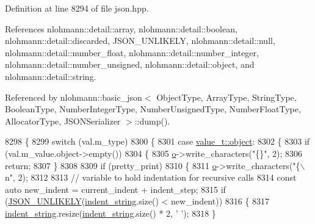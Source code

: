 Definition at line 8294 of file json.\+hpp.



References nlohmann\+::detail\+::array, nlohmann\+::detail\+::boolean, nlohmann\+::detail\+::discarded, J\+S\+O\+N\+\_\+\+U\+N\+L\+I\+K\+E\+LY, nlohmann\+::detail\+::null, nlohmann\+::detail\+::number\+\_\+float, nlohmann\+::detail\+::number\+\_\+integer, nlohmann\+::detail\+::number\+\_\+unsigned, nlohmann\+::detail\+::object, and nlohmann\+::detail\+::string.



Referenced by nlohmann\+::basic\+\_\+json$<$ Object\+Type, Array\+Type, String\+Type, Boolean\+Type, Number\+Integer\+Type, Number\+Unsigned\+Type, Number\+Float\+Type, Allocator\+Type, J\+S\+O\+N\+Serializer $>$\+::dump().


\begin{DoxyCode}
8298     \{
8299         \textcolor{keywordflow}{switch} (val.m\_type)
8300         \{
8301             \textcolor{keywordflow}{case} \hyperlink{namespacenlohmann_1_1detail_a1ed8fc6239da25abcaf681d30ace4985aa8cfde6331bd59eb2ac96f8911c4b666}{value\_t::object}:
8302             \{
8303                 \textcolor{keywordflow}{if} (val.m\_value.object->empty())
8304                 \{
8305                     \hyperlink{classnlohmann_1_1detail_1_1serializer_acf3c88660d3cbc65fc71c4d84f2a9f59}{o}->write\_characters(\textcolor{stringliteral}{"\{\}"}, 2);
8306                     \textcolor{keywordflow}{return};
8307                 \}
8308 
8309                 \textcolor{keywordflow}{if} (pretty\_print)
8310                 \{
8311                     \hyperlink{classnlohmann_1_1detail_1_1serializer_acf3c88660d3cbc65fc71c4d84f2a9f59}{o}->write\_characters(\textcolor{stringliteral}{"\{\(\backslash\)n"}, 2);
8312 
8313                     \textcolor{comment}{// variable to hold indentation for recursive calls}
8314                     \textcolor{keyword}{const} \textcolor{keyword}{auto} new\_indent = current\_indent + indent\_step;
8315                     \textcolor{keywordflow}{if} (\hyperlink{json_8hpp_ab77582407c64944e7db1ea95ab520253}{JSON\_UNLIKELY}(\hyperlink{classnlohmann_1_1detail_1_1serializer_ae9268a10d88a5526e32735a55a132fc6}{indent\_string}.size() < new\_indent))
8316                     \{
8317                         \hyperlink{classnlohmann_1_1detail_1_1serializer_ae9268a10d88a5526e32735a55a132fc6}{indent\_string}.resize(\hyperlink{classnlohmann_1_1detail_1_1serializer_ae9268a10d88a5526e32735a55a132fc6}{indent\_string}.size() * 2, \textcolor{charliteral}{' '});
8318                     \}

\end{DoxyCode}
